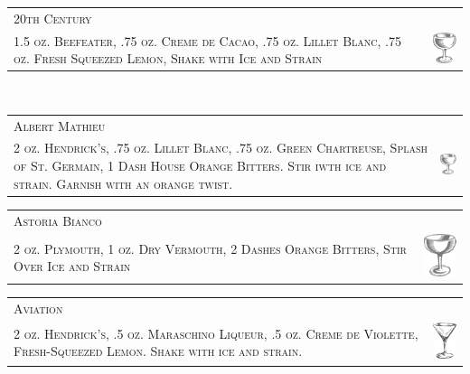 \documentclass{article}
\begin{document}
\begin{tabular}{b{2.5in} m{0.625in}}
  \multicolumn{2}{p{3.5in}}{\centering\Huge\textsc{20th Century}}\\ 
  \textsc{1.5 oz. Beefeater, .75 oz. Creme de
    Cacao, .75 oz. Lillet Blanc, .75 oz. Fresh Squeezed Lemon, Shake
    with Ice and Strain} &
  \includegraphics[width=0.5in]{coupe.png}
\end{tabular}\\

\begin{tabular}{b{2.5in} m{0.625in}}
  \multicolumn{2}{p{3.5in}}{\centering\Huge\textsc{Albert Mathieu}} \\ 
  \textsc{2 oz. Hendrick's, .75 oz. Lillet Blanc, .75 oz. Green Chartreuse, 
  Splash of St. Germain, 1 Dash House Orange Bitters. 
  Stir iwth ice and strain. Garnish with an orange twist.} &
  \includegraphics[width=0.5in]{coupe.png}
\end{tabular}

\begin{tabular}{b{2.5in} m{0.625in}}
  \multicolumn{2}{p{3.5in}}{\centering\Huge\textsc{Astoria Bianco}} \\ 
  \textsc{2 oz. Plymouth, 1 oz. Dry Vermouth, 2
  Dashes Orange Bitters, Stir Over Ice and Strain} &
  \includegraphics[width=0.5in]{egg_coupe.png}
\end{tabular}

\begin{tabular}{b{2.5in} m{0.625in}}
  \multicolumn{2}{p{3.5in}}{\centering\Huge\textsc{Aviation}} \\ 
  \textsc{2 oz. Hendrick's, .5 oz. Maraschino Liqueur, .5 oz.
  Creme de Violette, Fresh-Squeezed Lemon. Shake with ice and strain.} &
  \includegraphics[width=0.5in]{goblet.png}
\end{tabular}
\end{document}
